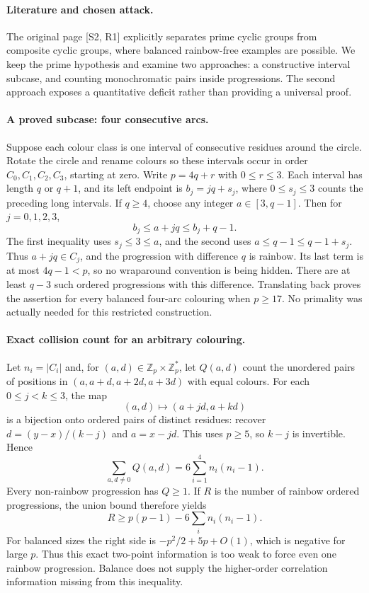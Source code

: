\documentclass[11pt,a4paper]{article}
\begin{document}
\paragraph{Literature and chosen attack.}
The original page [S2, R1] explicitly separates prime cyclic groups
from composite cyclic groups, where balanced rainbow-free examples
are possible. We keep the prime hypothesis and examine two approaches:
a constructive interval subcase, and counting monochromatic pairs
inside progressions. The second approach exposes a quantitative deficit
rather than providing a universal proof.

\paragraph{A proved subcase: four consecutive arcs.}
Suppose each colour class is one interval of consecutive residues around
the circle. Rotate the circle and rename colours so these intervals
occur in order $C_0,C_1,C_2,C_3$, starting at zero. Write
$p=4q+r$ with $0\le r\le3$. Each interval has length $q$ or $q+1$,
and its left endpoint is $b_j=jq+s_j$, where $0\le s_j\le3$ counts
the preceding long intervals. If $q\ge4$, choose any integer
$a\in[3,q-1]$. Then for $j=0,1,2,3$,
\[
 b_j\le a+jq\le b_j+q-1.
\]
The first inequality uses $s_j\le3\le a$, and the second uses
$a\le q-1\le q-1+s_j$. Thus $a+jq\in C_j$, and the progression
with difference $q$ is rainbow. Its last term is at most $4q-1<p$,
so no wraparound convention is being hidden. There are at least $q-3$
such ordered progressions with this difference. Translating back proves
the assertion for every balanced four-arc colouring when $p\ge17$.
No primality was actually needed for this restricted construction.

\paragraph{Exact collision count for an arbitrary colouring.}
Let $n_i=|C_i|$ and, for $(a,d)\in\mathbb Z_p\times\mathbb Z_p^*$,
let $Q(a,d)$ count the unordered pairs of positions in
$(a,a+d,a+2d,a+3d)$ with equal colours. For each $0\le j<k\le3$,
the map
\[
 (a,d)\longmapsto(a+jd,a+kd)
\]
is a bijection onto ordered pairs of distinct residues: recover
$d=(y-x)/(k-j)$ and $a=x-jd$. This uses $p\ge5$, so $k-j$ is
invertible. Hence
\[
 \sum_{a,d\ne0}Q(a,d)=6\sum_{i=1}^4n_i(n_i-1).
\]
Every non-rainbow progression has $Q\ge1$. If $R$ is the number of
rainbow ordered progressions, the union bound therefore yields
\[
 R\ge p(p-1)-6\sum_i n_i(n_i-1).
\]
For balanced sizes the right side is
$-p^2/2+5p+O(1)$, which is negative for large $p$. Thus this exact
two-point information is too weak to force even one rainbow progression.
Balance does not supply the higher-order correlation information missing
from this inequality.
\end{document}
